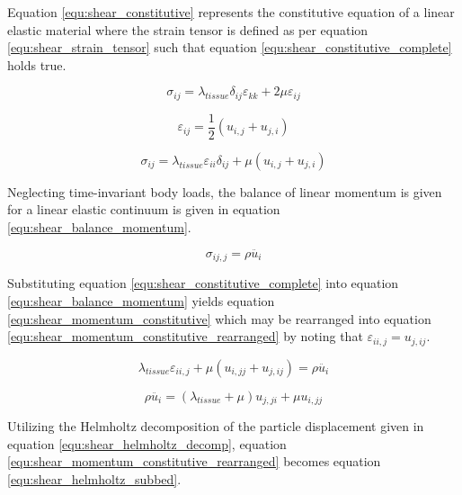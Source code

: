 			Equation \ref{equ:shear_constitutive} represents the constitutive equation of a linear elastic material where the strain tensor is defined as per equation \ref{equ:shear_strain_tensor} such that equation \ref{equ:shear_constitutive_complete} holds true.

			\begin{equation}
				\label{equ:shear_constitutive}
				\sigma_{ij} = \lambda_{tissue} \delta_{ij} \varepsilon_{kk} + 2 \mu \varepsilon_{ij}
			\end{equation}

			\begin{equation}
				\label{equ:shear_strain_tensor}
				\varepsilon_{ij} = \frac{1}{2}\left(u_{i,j} + u_{j,i}\right)
			\end{equation}

			\begin{equation}
				\label{equ:shear_constitutive_complete}
				\sigma_{ij} = \lambda_{tissue} \varepsilon_{ii} \delta_{ij} + \mu \left(u_{i,j} + u_{j,i}\right)
			\end{equation}

			Neglecting time-invariant body loads, the balance of linear momentum is given for a linear elastic continuum is given in equation \ref{equ:shear_balance_momentum}.

			\begin{equation}
				\label{equ:shear_balance_momentum}
				\sigma_{ij,j} = \rho \ddot{u_i}
			\end{equation}

			Substituting equation \ref{equ:shear_constitutive_complete} into equation \ref{equ:shear_balance_momentum} yields equation \ref{equ:shear_momentum_constitutive} which may be rearranged into equation \ref{equ:shear_momentum_constitutive_rearranged} by noting that $\varepsilon_{ii,j} = u_{j,ij}$.

			\begin{equation}
				\label{equ:shear_momentum_constitutive}
				\lambda_{tissue} \varepsilon_{ii,j} + \mu\left(u_{i,jj} + u_{j,ij}\right) = \rho \ddot{u_i}
			\end{equation}

			\begin{equation}
				\label{equ:shear_momentum_constitutive_rearranged}
				\rho \ddot{u_i} = \left(\lambda_{tissue} + \mu\right)u_{j,ji} + \mu u_{i,jj}
			\end{equation}

			Utilizing the Helmholtz decomposition of the particle displacement given in equation \ref{equ:shear_helmholtz_decomp}, equation \ref{equ:shear_momentum_constitutive_rearranged} becomes equation \ref{equ:shear_helmholtz_subbed}.

